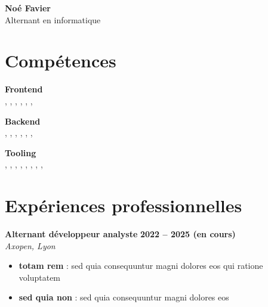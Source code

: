 \documentclass[a4paper,10pt]{article}
\begin{document}
\begin{paracol}{2}
\begin{flushleft}
\end{flushleft}

\switchcolumn

\begin{flushleft}
  
  {\fontsize{45}{36}\selectfont \textbf{Noé Favier}} \\
  \vspace{0.3em}
  {\Large Alternant en informatique} \\
  \vspace{1em}

  \section*{Compétences}

  \textbf{Frontend}\\
  , , , , , , 
  
  \vspace{0.5em}
  \textbf{Backend}\\
  , , , , , , 
  
  \vspace{0.5em}
  \textbf{Tooling}\\
  , , , , , , , , 

  \section*{Expériences professionnelles}

  \textbf{Alternant développeur analyste} \hfill \textbf{2022 – 2025 (en cours)}  \\
  \textit{Axopen, Lyon}\\
  \begin{itemize}[left=0pt,label={--},nosep]
    \item \textbf{totam rem} : sed quia consequuntur magni dolores eos qui ratione voluptatem
    \item \textbf{sed quia non} : sed quia consequuntur magni dolores eos
  \end{itemize}
  \vspace{1em}
  

\end{flushleft}
\end{paracol}
\end{document}
